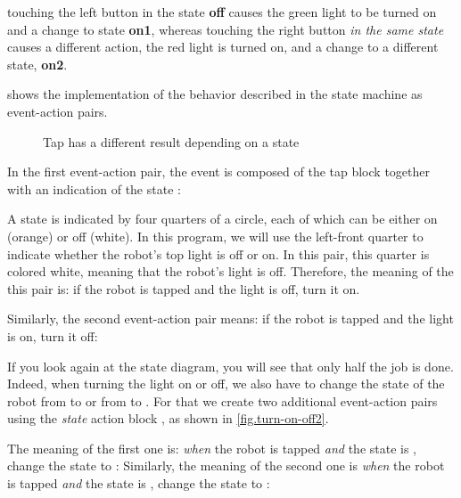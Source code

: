 touching the left button in the state \textbf{off} causes the green
light to be turned on and a change to state \textbf{on1}, whereas
touching the right button \emph{in the same state} causes a different
action, the red light is turned on, and a change to a different state, \textbf{on2}.


 shows the implementation of the behavior described
in the state machine as event-action pairs.

\begin{figure}
	\hfill
	\caption{Tap has a different result depending on a state}
	\label{fig.turn-on-off}
\end{figure}

In the first event-action pair, the event is composed of the
tap block together with an indication of the state : 

A state is indicated by four quarters of a circle, each of which can be
either on (orange) or off (white). In this program, we will use the left-front quarter to
indicate whether the robot's top light is off or on. In this pair, this
quarter is colored white, meaning that the robot's light is off.
Therefore, the meaning of the this pair is: if the robot is tapped and the light is off, turn
it on.

Similarly, the second event-action pair means: if the robot
is tapped and the light is on, turn it off: 

If you look again at the state diagram, you
will see that only half the job is done. Indeed, when turning the light on or
off, we also have to change the state of the robot from  to
 or from  to . For that we create two
additional event-action pairs using the \emph{state} action block
, as shown in \cref{fig.turn-on-off2}.

The meaning of the first one is: \emph{when} the robot is tapped
\emph{and} the state is , change the state to :
Similarly, the meaning of the second one is \emph{when} the robot
is tapped \emph{and} the state is , change the state to : 


